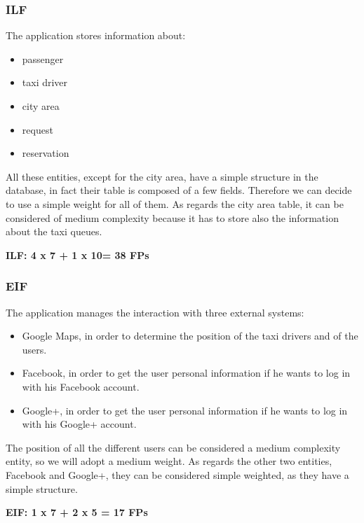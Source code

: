 		\subsubsection{ILF}
			The application stores information about:
			\begin{itemize}
				\item passenger
				\item taxi driver
				\item city area
				\item request
				\item reservation
			\end{itemize}
			All these entities, except for the city area, have a simple structure in the database, in fact their table is composed of a few fields. Therefore we can decide to use a simple weight for all of them. As regards the city area table, it can be considered of medium complexity because it has to store also the information about the taxi queues.
			\begin{center}
				\textbf{ILF: 4 x 7 + 1 x 10= 38 FPs}
			\end{center}
		\subsubsection{EIF}
			The application manages the interaction with three external systems:
			\begin{itemize}
				\item Google Maps, in order to determine the position of the taxi drivers and of the users.
				\item Facebook, in order to get the user personal information if he wants to log in with his Facebook account.
				\item Google+, in  order to get the user personal information if he wants to log in with his Google+ account.
			\end{itemize}
			The position of all the different users can be considered a medium complexity entity, so we will adopt a medium weight. As regards the other two entities, Facebook and Google+, they can be considered simple weighted, as they have a simple structure.\\
			\begin{center}
				\textbf{EIF: 1 x 7 + 2 x 5 = 17 FPs}
			\end{center}
